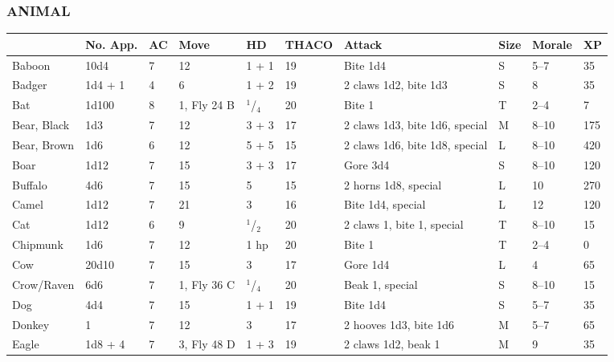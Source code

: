 \noindent
\begin{minipage}{\columnwidth}

\subsubsection{ANIMAL}

\noindent\begin{tabular}{p{}p{}p{}p{}p{}p{}p{}p{}p{}p{}}
  & \textbf{No. App.}	& \textbf{AC}	& \textbf{Move}	& \textbf{HD}	& \textbf{THACO}	& \textbf{Attack}	& \textbf{Size}	&\textbf{Morale} & \textbf{XP} \\ 
\hline
\rowcolor[gray]{.9}Baboon	& 10d4	& 7	& 12	& 1 + 1	& 19	& Bite 1d4	& S	& 5--7	& 35 \\
Badger	& 1d4 + 1	& 4	& 6	& 1 + 2	& 19	& 2 claws 1d2, bite 1d3	& S	& 8	& 35 \\
\rowcolor[gray]{.9}Bat		& 1d100	& 8	& 1, Fly 24 B	& $^1$/$_4$	& 20	& Bite 1	& T	& 2--4	& 7 \\ %
Bear, Black	& 1d3	& 7	& 12	& 3 + 3	& 17	& 2 claws 1d3, bite 1d6, special	& M	& 8--10	& 175 \\ 
\rowcolor[gray]{.9}Bear, Brown	& 1d6	& 6	& 12	& 5 + 5	& 15	& 2 claws 1d6, bite 1d8, special	& L	& 8--10	& 420 \\ 
Boar	& 1d12	& 7	& 15	& 3 + 3	& 17	& Gore 3d4	& S	& 8--10	& 120 \\ %
\rowcolor[gray]{.9}Buffalo	& 4d6	& 7	& 15	& 5		& 15	& 2 horns 1d8, special	& L	& 10	& 270 \\ %
Camel	& 1d12	& 7	& 21	& 3		& 16	& Bite 1d4, special	& L	& 12	& 120 \\ %
\rowcolor[gray]{.9}Cat		& 1d12	& 6	& 9	& $^1$/$_2$	& 20	& 2 claws 1, bite 1, special	& T	& 8--10	& 15 \\ %
Chipmunk	& 1d6	& 7	& 12	& 1 hp	& 20	& Bite 1	& T	& 2--4	& 0 \\
\rowcolor[gray]{.9}Cow		& 20d10	& 7	& 15	& 3 	& 17	& Gore 1d4	& L	& 4	& 65 \\
Crow/Raven	& 6d6	& 7	& 1, Fly 36 C	& $^1$/$_4$	& 20	& Beak 1, special	& S	& 8--10	& 15 \\
\rowcolor[gray]{.9}Dog		& 4d4	& 7	& 15	& 1 + 1	& 19	& Bite 1d4	& S	& 5--7	& 35 \\
Donkey	& 1		& 7	& 12	& 3		& 17	& 2 hooves 1d3, bite 1d6	& M	&5--7	& 65 \\		
\rowcolor[gray]{.9}Eagle	& 1d8 + 4	& 7	& 3, Fly 48 D	& 1 + 3	& 19	& 2 claws 1d2, beak 1	& M	& 9	& 35 \\ %

\end{tabular}
\end{minipage}
